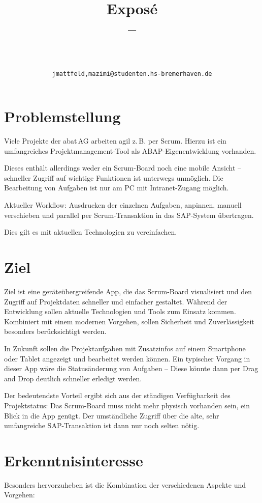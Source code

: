 \documentclass[10pt, a4paper]{article}
\title{Exposé\\--\\\myTitle}
\author{\myName\\
\myUni\\
\tt {jmattfeld,mazimi}@studenten.hs-bremerhaven.de}
\date{}
\begin{document}
\maketitleabstract

\section{Problemstellung}
Viele Projekte der abat\,AG arbeiten agil z.\,B. per Scrum.
Hierzu ist ein umfangreiches Projektmanagement-Tool als ABAP-Eigenentwicklung
vorhanden.

Dieses enthält allerdings weder ein Scrum-Board noch eine mobile Ansicht --
schneller Zugriff auf wichtige Funktionen ist unterwegs unmöglich. Die
Bearbeitung von Aufgaben ist nur am PC mit Intranet-Zugang möglich.

Aktueller Workflow: Ausdrucken der einzelnen Aufgaben, anpinnen, manuell
verschieben und parallel per Scrum-Transaktion in das SAP-System übertragen.

Dies gilt es mit aktuellen Technologien zu vereinfachen.

\section{Ziel}
Ziel ist eine geräteübergreifende App, die das Scrum-Board visualisiert und den
Zugriff auf Projektdaten schneller und einfacher gestaltet.
Während der Entwicklung sollen aktuelle Technologien und Tools zum Einsatz
kommen.
Kombiniert mit einem modernen Vorgehen, sollen Sicherheit und Zuverlässigkeit
besonders berücksichtigt werden.

In Zukunft sollen die Projektaufgaben mit Zusatzinfos auf einem Smartphone oder
Tablet angezeigt und bearbeitet werden können. Ein typischer Vorgang in dieser
App wäre die Statusänderung von Aufgaben -- Diese könnte dann per Drag and Drop
deutlich schneller erledigt werden.

Der bedeutendste Vorteil ergibt sich aus der ständigen Verfügbarkeit des
Projektstatus:
Das Scrum-Board muss nicht mehr physisch vorhanden sein, ein Blick in die App
genügt.
Der umständliche Zugriff über die alte, sehr umfangreiche SAP-Transaktion ist
dann nur noch selten nötig.

\section{Erkenntnisinteresse}
Besonders hervorzuheben ist die Kombination der verschiedenen Aspekte und
Vorgehen:
\end{document}
